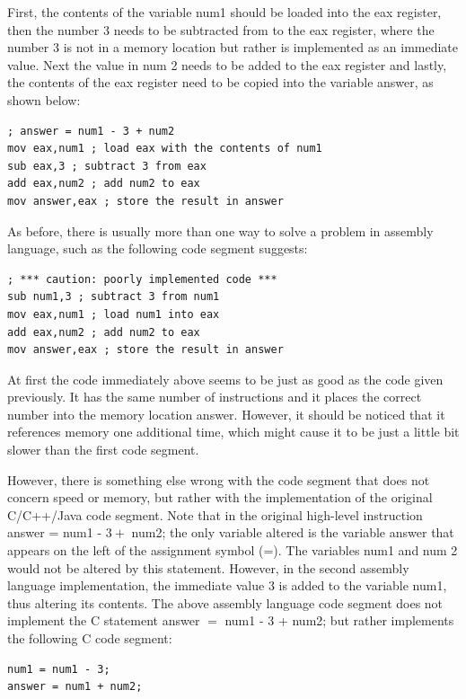 \documentclass[10pt]{book}
\begin{document}
First, the contents of the variable num1 should be loaded into the eax register, then the number 3 needs to be subtracted from to the eax register, where the number 3 is not in a memory location but rather is implemented as an immediate value. Next the value in num 2 needs to be added to the eax register and lastly, the contents of the eax register need to be copied into the variable answer, as shown below:

\begin{verbatim}
; answer = num1 - 3 + num2
mov eax,num1 ; load eax with the contents of num1
sub eax,3 ; subtract 3 from eax
add eax,num2 ; add num2 to eax
mov answer,eax ; store the result in answer
\end{verbatim}

As before, there is usually more than one way to solve a problem in assembly language, such as the following code segment suggests:

\begin{verbatim}
; *** caution: poorly implemented code ***
sub num1,3 ; subtract 3 from num1
mov eax,num1 ; load num1 into eax
add eax,num2 ; add num2 to eax
mov answer,eax ; store the result in answer
\end{verbatim}

At first the code immediately above seems to be just as good as the code given previously. It has the same number of instructions and it places the correct number into the memory location answer. However, it should be noticed that it references memory one additional time, which might cause it to be just a little bit slower than the first code segment.

However, there is something else wrong with the code segment that does not concern speed or memory, but rather with the implementation of the original C/C++/Java code segment. Note that in the original high-level instruction answer = num1 - $3+$ num2; the only variable altered is the variable answer that appears on the left of the assignment symbol (=). The variables num1 and num 2 would not be altered by this statement. However, in the second assembly language implementation, the immediate value 3 is added to the variable num1, thus altering its contents. The above assembly language code segment does not implement the C statement answer $=$ num1 - 3 + num2; but rather implements the following C code segment:

\begin{verbatim}
num1 = num1 - 3;
answer = num1 + num2;
\end{verbatim}
\end{document}
